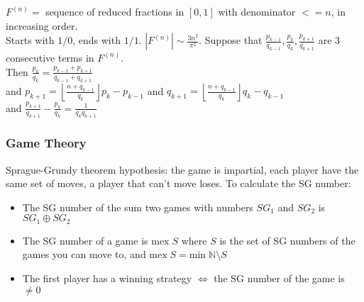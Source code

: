 \documentclass[landscape,a4paper,twocolumn,10pt]{report}
\begin{document}
\noindent
$F^{(n)} = $ sequence of reduced fractions in $[0,1]$ with denominator $<= n$, in increasing order. \\
Starts with $1/0$, ends with $1/1$. $|F^{(n)}| \sim \frac{3n^2}{\pi^2}$.
Suppose that $\frac{p_{k-1}}{q_{k-1}}, \frac{p_{k}}{q_{k}}, \frac{p_{k+1}}{q_{k+1}}$ are 3 consecutive terms in $F^{(n)}$. \\
Then $\frac{p_k}{q_k} = \frac{p_{k-1} + p_{k+1}}{q_{k-1} + q_{k+1}}$ \\
and $p_{k+1} = \left\lfloor \frac{n+q_{k-1}}{q_k} \right\rfloor p_k - p_{k-1}$ and  $q_{k+1} = \left\lfloor \frac{n+q_{k-1}}{q_k} \right\rfloor q_k - q_{k-1}$ \\
and $\frac{p_{k+1}}{q_{k+1}} - \frac{p_k}{q_k} = \frac{1}{q_k q_{k+1}}$


\subsubsection*{Game Theory}

Sprague-Grundy theorem hypothesis: the game is impartial, each player have the same set of moves, a player that can't move loses.
To calculate the SG number:
\begin{itemize}
    \item The SG number of the sum two games with numbers $SG_1$ and $SG_2$ is $SG_1 \oplus SG_2$
    \item The SG number of a game is $\mathrm{mex} \; S$ where $S$ is the set of SG numbers of the games you can move to, and $\mathrm{mex} \; S = \mathrm{min} \; \mathbb{N} \setminus S$
    \item The first player has a winning strategy $\Leftrightarrow$ the SG number of the game is $\neq 0$
\end{itemize}
\end{document}

